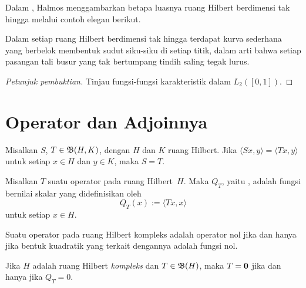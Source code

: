 Dalam \cite{Halmos:1982}, Halmos menggambarkan betapa luasnya ruang Hilbert berdimensi tak hingga melalui
contoh elegan berikut.

\begin{exam} Dalam setiap ruang Hilbert berdimensi tak hingga terdapat kurva sederhana yang berbelok membentuk sudut siku-siku
di setiap titik, dalam arti bahwa setiap pasangan tali busur yang tak bertumpang tindih saling tegak lurus.
\end{exam}

\begin{proof}[\emph{Petunjuk pembuktian}] Tinjau fungsi-fungsi karakteristik dalam $L_2([0,1])$. \ns
\end{proof}
























\section{Operator dan Adjoinnya}

\begin{prop}\label{C0635103} Misalkan $S$, $T \in \mathfrak{B}(H,K)$, dengan $H$ dan $K$ ruang
Hilbert. Jika $\langle Sx,y \rangle = \langle Tx,y \rangle$ untuk setiap $x \in H$ dan $y \in
K$, maka $S = T$.
\end{prop}

\begin{defn} Misalkan $T$ suatu operator pada ruang Hilbert~$H$. Maka $Q_T$, yaitu
, adalah fungsi bernilai skalar yang didefinisikan oleh
   \[ Q_T(x) := \langle Tx,x \rangle \]
untuk setiap $x \in H$.
\end{defn}

Suatu operator pada ruang Hilbert kompleks adalah operator nol jika dan hanya jika bentuk kuadratik yang terkait dengannya adalah fungsi nol.

\begin{prop}\label{C0635105} Jika $H$ adalah ruang Hilbert \emph{kompleks} dan $T \in \mathfrak{B}(H)$, maka
$T = \mathbf{0}$ jika dan hanya jika $Q_T = 0$.
\end{prop}

